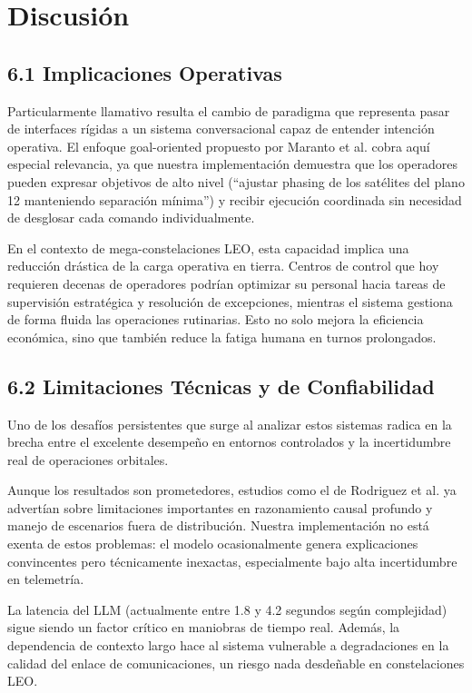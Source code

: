 \section{Discusión}

\subsection{6.1 Implicaciones Operativas}

Particularmente llamativo resulta el cambio de paradigma que representa pasar de interfaces rígidas a un sistema conversacional capaz de entender intención operativa. El enfoque goal-oriented propuesto por Maranto et al. \cite{maranto2024llmsat} cobra aquí especial relevancia, ya que nuestra implementación demuestra que los operadores pueden expresar objetivos de alto nivel (“ajustar phasing de los satélites del plano 12 manteniendo separación mínima”) y recibir ejecución coordinada sin necesidad de desglosar cada comando individualmente.

En el contexto de mega-constelaciones LEO, esta capacidad implica una reducción drástica de la carga operativa en tierra. Centros de control que hoy requieren decenas de operadores podrían optimizar su personal hacia tareas de supervisión estratégica y resolución de excepciones, mientras el sistema gestiona de forma fluida las operaciones rutinarias. Esto no solo mejora la eficiencia económica, sino que también reduce la fatiga humana en turnos prolongados.

\subsection{6.2 Limitaciones Técnicas y de Confiabilidad}

Uno de los desafíos persistentes que surge al analizar estos sistemas radica en la brecha entre el excelente desempeño en entornos controlados y la incertidumbre real de operaciones orbitales.

Aunque los resultados son prometedores, estudios como el de Rodriguez et al. \cite{rodriguez2024llm} ya advertían sobre limitaciones importantes en razonamiento causal profundo y manejo de escenarios fuera de distribución. Nuestra implementación no está exenta de estos problemas: el modelo ocasionalmente genera explicaciones convincentes pero técnicamente inexactas, especialmente bajo alta incertidumbre en telemetría. 

La latencia del LLM (actualmente entre 1.8 y 4.2 segundos según complejidad) sigue siendo un factor crítico en maniobras de tiempo real. Además, la dependencia de contexto largo hace al sistema vulnerable a degradaciones en la calidad del enlace de comunicaciones, un riesgo nada desdeñable en constelaciones LEO.

